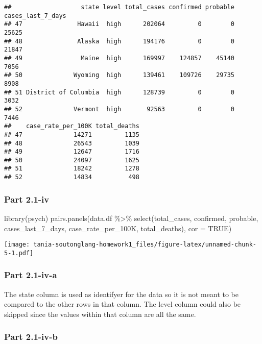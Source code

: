 \documentclass[
]{article}
\newenvironment{Shaded}{\begin{snugshade}}{\end{snugshade}}
\newcommand{\AttributeTok}[1]{\textcolor[rgb]{0.77,0.63,0.00}{#1}}
\newcommand{\ConstantTok}[1]{\textcolor[rgb]{0.00,0.00,0.00}{#1}}
\newcommand{\FunctionTok}[1]{\textcolor[rgb]{0.00,0.00,0.00}{#1}}
\newcommand{\NormalTok}[1]{#1}
\newcommand{\SpecialCharTok}[1]{\textcolor[rgb]{0.00,0.00,0.00}{#1}}
\begin{document}
\begin{verbatim}
##                   state level total_cases confirmed probable cases_last_7_days
## 47               Hawaii  high      202064         0        0             25625
## 48               Alaska  high      194176         0        0             21847
## 49                Maine  high      169997    124857    45140              7056
## 50              Wyoming  high      139461    109726    29735              8908
## 51 District of Columbia  high      128739         0        0              3032
## 52              Vermont  high       92563         0        0              7446
##    case_rate_per_100K total_deaths
## 47              14271         1135
## 48              26543         1039
## 49              12647         1716
## 50              24097         1625
## 51              18242         1278
## 52              14834          498
\end{verbatim}

\hypertarget{part-2.1-iv}{%
\subsubsection{Part 2.1-iv}\label{part-2.1-iv}}

\begin{Shaded}
\begin{Highlighting}[]
\FunctionTok{library}\NormalTok{(psych)}
\FunctionTok{pairs.panels}\NormalTok{(data.df }\SpecialCharTok{\%\textgreater{}\%} \FunctionTok{select}\NormalTok{(total\_cases, confirmed, probable, cases\_last\_7\_days, case\_rate\_per\_100K, total\_deaths), }\AttributeTok{cor =} \ConstantTok{TRUE}\NormalTok{)}
\end{Highlighting}
\end{Shaded}

\texttt{[image: tania-soutonglang-homework1\_files/figure-latex/unnamed-chunk-5-1.pdf]}

\hypertarget{part-2.1-iv-a}{%
\subsubsection{Part 2.1-iv-a}\label{part-2.1-iv-a}}

The state column is used as identifyer for the data so it is not meant
to be compared to the other rows in that column. The level column could
also be skipped since the values within that column are all the same.

\hypertarget{part-2.1-iv-b}{%
\subsubsection{Part 2.1-iv-b}\label{part-2.1-iv-b}}
\end{document}
